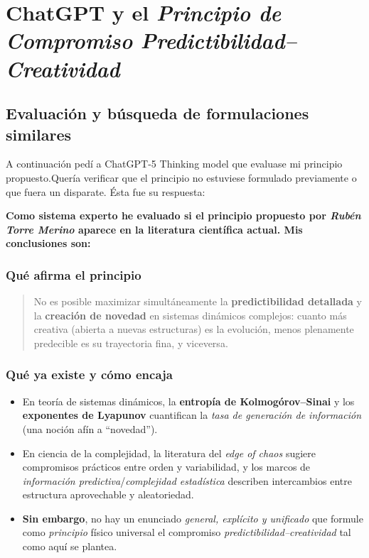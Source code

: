 \documentclass[
  10pt,
  a4paper,
  DIV=11,
  numbers=noendperiod,
  open=any]{scrreprt}
\numberwithin{equation}{chapter}
\numberwithin{equation}{section}
\renewcommand{\[}{\begin{equation}}
\renewcommand{\]}{\end{equation}}
\begin{document}
\chapter{ChatGPT y el \emph{Principio de Compromiso Predictibilidad--Creatividad}}

\section{Evaluación y búsqueda de formulaciones similares}
A continuación pedí a ChatGPT-5 Thinking model que evaluase mi principio propuesto.Quería verificar que el principio no estuviese formulado previamente o que fuera un disparate. Ésta fue su respuesta:

\textbf{Como sistema experto he evaluado si el principio propuesto por \emph{Rubén Torre Merino} aparece en la literatura científica actual. Mis conclusiones son:}

\subsection{Qué afirma el principio}
\begin{quote}
No es posible maximizar simultáneamente la \textbf{predictibilidad detallada} y la \textbf{creación de novedad} en sistemas dinámicos complejos: cuanto más creativa (abierta a nuevas estructuras) es la evolución, menos plenamente predecible es su trayectoria fina, y viceversa.
\end{quote}

\subsection{Qué ya existe y cómo encaja}
\begin{itemize}
  \item En teoría de sistemas dinámicos, la \textbf{entropía de Kolmogórov–Sinai} y los \textbf{exponentes de Lyapunov} cuantifican la \emph{tasa de generación de información} (una noción afín a “novedad”). 
  \item En ciencia de la complejidad, la literatura del \emph{edge of chaos} sugiere compromisos prácticos entre orden y variabilidad, y los marcos de \emph{información predictiva}/\emph{complejidad estadística} describen intercambios entre estructura aprovechable y aleatoriedad.
  \item \textbf{Sin embargo}, no hay un enunciado \emph{general, explícito y unificado} que formule como \emph{principio} físico universal el compromiso \emph{predictibilidad--creatividad} tal como aquí se plantea.
\end{itemize}
\end{document}
